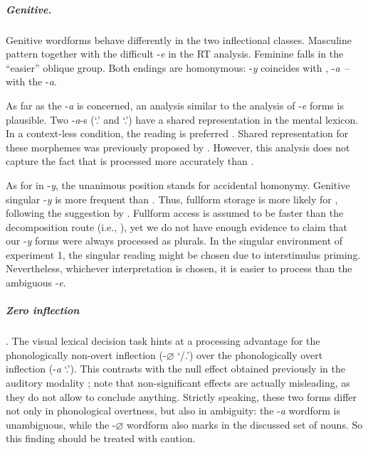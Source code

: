 \documentclass[output=paper, modfonts,newtxmath,hidelinks]{langscibook}
\begin{document}
\subparagraph*{{Genitive.}} Genitive wordforms behave differently in the two inflectional classes. Masculine   pattern together with the difficult -\textit{e} in the RT analysis. Feminine  falls in the “easier” oblique group. Both  endings are homonymous:   -\textit{y} coincides with  ,   -\textit{a}~\--- with the   -\textit{a}. 

As far as the   -\textit{a} is concerned, an analysis similar to the analysis of -\textit{e} forms is plausible. Two -\textit{a}-s (`\genn.\masc' and `\nomm.\fem')
have a shared representation in the mental lexicon. In a context-less condition, the  reading is preferred . Shared representation for these morphemes was previously proposed by \citet{muller2004decomposing, wunderlich2004there}. However, this analysis does not capture the fact that   is processed more accurately than  .

As for   in -\textit{y}, the unanimous position \citep{muller2004decomposing,wunderlich2004there,wiese2004categories} stands for accidental homonymy. Genitive singular -\textit{y} is more frequent than   \citep{samojlova2014frequencies}. Thus, fullform storage is more likely for  , following the suggestion by \citet{bertram2000role}. Fullform access is assumed to be faster than the decomposition route (i.e., \citealt{bertram2000role}), yet we do not have enough evidence to claim that our -\textit{y} forms were always processed as  plurals. In the singular environment of experiment 1, the singular reading might be chosen due to interstimulus priming. Nevertheless, whichever interpretation is chosen, it is easier to process than the ambiguous -\textit{e}.

\subparagraph*{{Zero  inflection}}. The visual lexical decision task hints at a processing advantage for the phonologically non-overt inflection (-\textit{$\varnothing$} `{\nomm/\accc.\masc}’) over the phonologically overt inflection (-\textit{a} `{\nomm.\fem}’). This contrasts with the null effect obtained previously in the auditory modality \citep{gor2017processing}; note that non-significant effects are actually misleading, as they do not allow to conclude anything. Strictly speaking, these two forms differ not only in phonological overtness, but also in ambiguity: the -\textit{a} wordform is unambiguous, while the -\textit{$\varnothing$} wordform also marks  in the discussed set of nouns. So this finding should be treated with caution.
\end{document}
